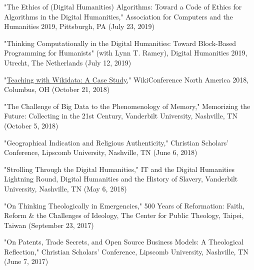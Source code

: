 \documentclass[]{res} %
\begin{document}
\begin{resume}
\begin{hangparas}{.25in}{1}"The Ethics of (Digital Humanities) Algorithms: Toward a Code of Ethics for Algorithms in the Digital Humanities," Association for Computers and the Humanities 2019, Pittsburgh, PA (July 23, 2019)\end{hangparas}

\begin{hangparas}{.25in}{1}"Thinking Computationally in the Digital Humanities: Toward Block-Based Programming for Humanists" (with Lynn T. Ramey), Digital Humanities 2019, Utrecht, The Netherlands (July 12, 2019)\end{hangparas}

\begin{hangparas}{.25in}{1}"\href{https://commons.wikimedia.org/wiki/File:Teaching_with_Wikidata-A_Case_Study.pdf}{Teaching with Wikidata: A Case Study}," WikiConference North America 2018, Columbus, OH (October 21, 2018)\end{hangparas}

\begin{hangparas}{.25in}{1}"The Challenge of Big Data to the Phenomenology of Memory," Memorizing the Future: Collecting in the 21st Century, Vanderbilt University, Nashville, TN (October 5, 2018)\end{hangparas}

\begin{hangparas}{.25in}{1}"Geographical Indication and Religious Authenticity," Christian Scholars’ Conference, Lipscomb University, Nashville, TN (June 6, 2018)\end{hangparas}

\begin{hangparas}{.25in}{1}"Strolling Through the Digital Humanities," IT and the Digital Humanities Lightning Round, Digital Humanities and the History of Slavery, Vanderbilt University, Nashville, TN (May 6, 2018)\end{hangparas}

\begin{hangparas}{.25in}{1}"On Thinking Theologically in Emergencies," 500 Years of Reformation: Faith, Reform \& the Challenges of Ideology, The Center for Public Theology, Taipei, Taiwan (September 23, 2017)\end{hangparas}

\begin{hangparas}{.25in}{1}"On Patents, Trade Secrets, and Open Source Business Models: A Theological Reflection," Christian Scholars’ Conference, Lipscomb University, Nashville, TN (June 7, 2017)\end{hangparas}


\end{resume}
\end{document}
